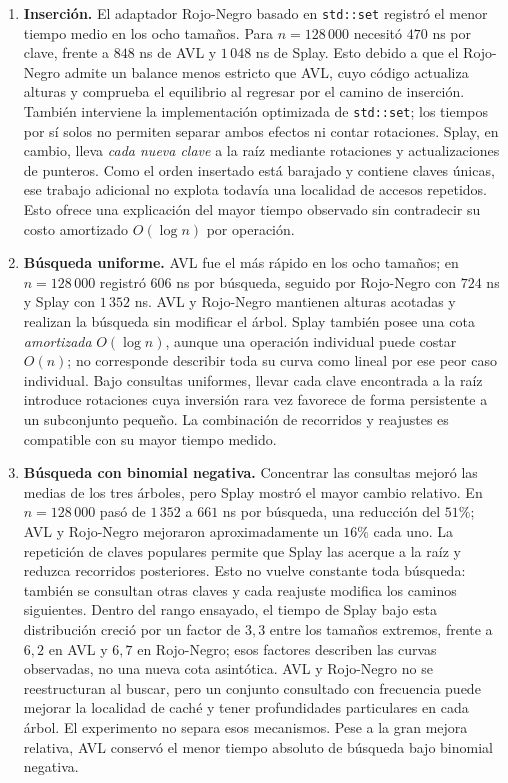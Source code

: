 \documentclass[11pt,letterpaper]{article}
\begin{document}
\begin{enumerate}
    \item \textbf{Inserción.} El adaptador Rojo-Negro basado en
    \texttt{std::set} registró el menor tiempo medio en los ocho tamaños.
    Para $n=128\,000$ necesitó $470$ ns por clave, frente a $848$ ns de AVL
    y $1\,048$ ns de Splay. Esto debido a que el Rojo-Negro
    admite un balance menos estricto que AVL, cuyo código actualiza alturas
    y comprueba el equilibrio al regresar por el camino de inserción. También
    interviene la implementación optimizada de \texttt{std::set}; los tiempos
    por sí solos no permiten separar ambos efectos ni contar rotaciones.
    Splay, en cambio, lleva \emph{cada nueva clave} a la raíz mediante
    rotaciones y actualizaciones de punteros. Como el orden insertado está
    barajado y contiene claves únicas, ese trabajo adicional no explota
    todavía una localidad de accesos repetidos. Esto ofrece una explicación
    del mayor tiempo observado sin contradecir su costo amortizado
    $O(\log n)$ por operación.

    \item \textbf{Búsqueda uniforme.} AVL fue el más rápido en los ocho
    tamaños; en $n=128\,000$ registró $606$ ns por búsqueda, seguido por
    Rojo-Negro con $724$ ns y Splay con $1\,352$ ns. AVL y Rojo-Negro
    mantienen alturas acotadas y realizan la búsqueda sin modificar el
    árbol. Splay también posee una cota \emph{amortizada} $O(\log n)$,
    aunque una operación individual puede costar $O(n)$; no corresponde
    describir toda su curva como lineal por ese peor caso individual. Bajo
    consultas uniformes, llevar cada clave encontrada a la raíz introduce
    rotaciones cuya inversión rara vez favorece de forma persistente a un
    subconjunto pequeño. La combinación de recorridos y reajustes es
    compatible con su mayor tiempo medido.

    \item \textbf{Búsqueda con binomial negativa.} Concentrar las consultas
    mejoró las medias de los tres árboles, pero Splay mostró el mayor cambio
    relativo. En $n=128\,000$ pasó de $1\,352$ a $661$ ns por búsqueda,
    una reducción del $51\%$; AVL y Rojo-Negro mejoraron aproximadamente un
    $16\%$ cada uno. La repetición de claves populares permite que Splay
    las acerque a la raíz y reduzca recorridos posteriores. Esto no vuelve
    constante toda búsqueda: también se consultan otras claves y cada
    reajuste modifica los caminos siguientes. Dentro del rango ensayado, el
    tiempo de Splay bajo esta distribución creció por un factor de $3{,}3$
    entre los tamaños extremos, frente a $6{,}2$ en AVL y $6{,}7$ en
    Rojo-Negro; esos factores describen las curvas observadas, no una nueva
    cota asintótica. AVL y Rojo-Negro no se reestructuran al buscar, pero un
    conjunto consultado con frecuencia puede mejorar la localidad de caché
    y tener profundidades particulares en cada árbol. El experimento no
    separa esos mecanismos. Pese a la gran mejora relativa, AVL conservó el
    menor tiempo absoluto de búsqueda bajo binomial negativa.


\end{enumerate}
\end{document}
